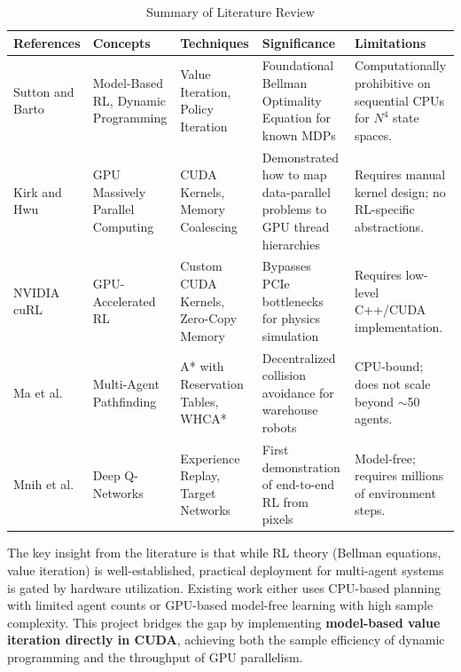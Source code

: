 \documentclass[12pt,a4paper]{article}
\begin{document}
\begin{table}[htp]
\centering
\caption{Summary of Literature Review}
\label{Table1}
\begin{tabular}{|p{2cm}|p{2.5cm}|p{2.5cm}|p{3cm}|p{3.5cm}|}
\hline \textbf{References} & \textbf{Concepts} & \textbf{Techniques} & \textbf{Significance} & \textbf{Limitations} \\
\hline Sutton and Barto \cite{sutton2018reinforcement} & Model-Based RL, Dynamic Programming & Value Iteration, Policy Iteration & Foundational Bellman Optimality Equation for known MDPs & Computationally prohibitive on sequential CPUs for $N^4$ state spaces. \\
\hline Kirk and Hwu \cite{kirk2016programming} & GPU Massively Parallel Computing & CUDA Kernels, Memory Coalescing & Demonstrated how to map data-parallel problems to GPU thread hierarchies & Requires manual kernel design; no RL-specific abstractions. \\
\hline NVIDIA cuRL \cite{nvidia} & GPU-Accelerated RL & Custom CUDA Kernels, Zero-Copy Memory & Bypasses PCIe bottlenecks for physics simulation & Requires low-level C++/CUDA implementation. \\
\hline Ma et al. \cite{ma2016lifelong} & Multi-Agent Pathfinding & A* with Reservation Tables, WHCA* & Decentralized collision avoidance for warehouse robots & CPU-bound; does not scale beyond $\sim$50 agents. \\
\hline Mnih et al. \cite{mnih2015human} & Deep Q-Networks & Experience Replay, Target Networks & First demonstration of end-to-end RL from pixels & Model-free; requires millions of environment steps. \\
\hline
\end{tabular}
\end{table}

The key insight from the literature is that while RL theory (Bellman equations, value iteration) is well-established, practical deployment for multi-agent systems is gated by hardware utilization. Existing work either uses CPU-based planning with limited agent counts or GPU-based model-free learning with high sample complexity. This project bridges the gap by implementing \textbf{model-based value iteration directly in CUDA}, achieving both the sample efficiency of dynamic programming and the throughput of GPU parallelism.

\newpage
\end{document}
